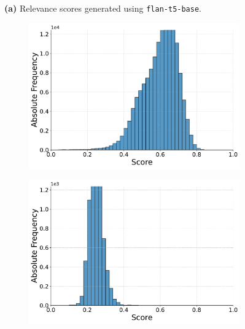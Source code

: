\begin{figure}[t!]
    \vspace{-0.5cm}
    \textbf{(a)} Relevance scores generated using \texttt{flan-t5-base}.
    \vspace{0.5cm}

    \begin{subfigure}[b]{0.49\textwidth}
        \centering
        \includegraphics[width=\textwidth]{graphics/seaborn/pairwise_cw22_score_distribution_flan-t5-small.pdf}
        \label{fig:pairwise_flan-t5-small}
    \end{subfigure}
    \hfill
    \begin{subfigure}[b]{0.49\textwidth}
        \centering
        \includegraphics[width=\textwidth]{graphics/seaborn/pointwise_cw22_score_distribution_flan-t5-small.pdf}
        \label{fig:pointwise_flan-t5-small}
    \end{subfigure}


\end{figure}
